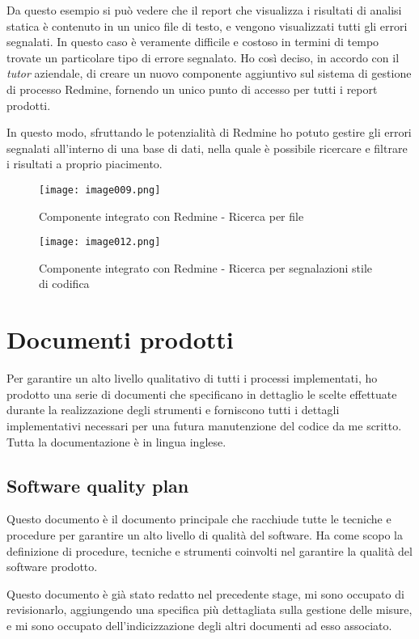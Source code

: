 Da questo esempio si può vedere che il report che visualizza i risultati di analisi statica è contenuto in un unico file di testo, e vengono visualizzati tutti gli errori segnalati. In questo caso è veramente difficile e costoso in termini di tempo trovate un particolare tipo di errore segnalato. Ho così deciso, in accordo con il \textit{tutor} aziendale, di creare un nuovo componente aggiuntivo sul sistema di gestione di processo Redmine, fornendo un unico punto di accesso per tutti i report prodotti.

In questo modo, sfruttando le potenzialità di Redmine ho potuto gestire gli errori segnalati all'interno di una base di dati, nella quale è possibile ricercare e filtrare i risultati a proprio piacimento.

\begin{figure}[H]
  \centering
  \texttt{[image: image009.png]}
  \caption{Componente integrato con Redmine - Ricerca per file}
\end{figure}

\begin{figure}[H]
  \centering
  \texttt{[image: image012.png]}
  \caption{Componente integrato con Redmine - Ricerca per segnalazioni stile di codifica}
\end{figure}


\section{Documenti prodotti}
Per garantire un alto livello qualitativo di tutti i processi implementati, ho prodotto una serie di documenti che specificano in dettaglio le scelte effettuate durante la realizzazione degli strumenti e forniscono tutti i dettagli implementativi necessari per una futura manutenzione del codice da me scritto.
Tutta la documentazione è in lingua inglese.

\subsection{Software quality plan}
Questo documento è il documento principale che racchiude tutte le tecniche e procedure per garantire un alto livello di qualità del software. Ha come scopo la definizione di procedure, tecniche e strumenti coinvolti nel garantire la qualità del software prodotto.

Questo documento è già stato redatto nel precedente stage, mi sono occupato di revisionarlo, aggiungendo una specifica più dettagliata sulla gestione delle misure, e mi sono occupato dell'indicizzazione degli altri documenti ad esso associato.

